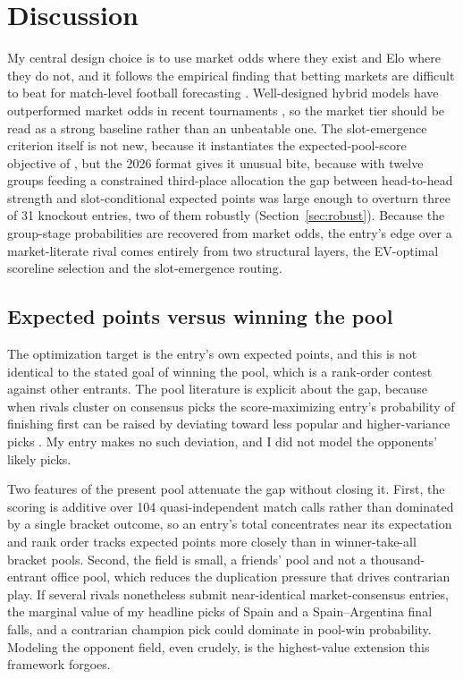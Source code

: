 \documentclass[11pt,letterpaper]{article}
\begin{document}
\section{Discussion}

My central design choice is to use market odds where they exist and Elo where they do not, and it follows the empirical finding that betting markets are difficult to beat for match-level football forecasting \citep{strumbelj2014, leitner2010, hvattum2010}. Well-designed hybrid models have outperformed market odds in recent tournaments \citep{groll2019}, so the market tier should be read as a strong baseline rather than an unbeatable one. The slot-emergence criterion itself is not new, because it instantiates the expected-pool-score objective of \citet{kaplangarstka2001}, but the 2026 format gives it unusual bite, because with twelve groups feeding a constrained third-place allocation the gap between head-to-head strength and slot-conditional expected points was large enough to overturn three of 31 knockout entries, two of them robustly (Section~\ref{sec:robust}). Because the group-stage probabilities are recovered from market odds, the entry's edge over a market-literate rival comes entirely from two structural layers, the EV-optimal scoreline selection and the slot-emergence routing.

\subsection{Expected points versus winning the pool}\label{sec:objective}

The optimization target is the entry's own expected points, and this is not identical to the stated goal of winning the pool, which is a rank-order contest against other entrants. The pool literature is explicit about the gap, because when rivals cluster on consensus picks the score-maximizing entry's probability of finishing first can be raised by deviating toward less popular and higher-variance picks \citep{clairletscher2007, kaplangarstka2001}. My entry makes no such deviation, and I did not model the opponents' likely picks.

Two features of the present pool attenuate the gap without closing it. First, the scoring is additive over 104 quasi-independent match calls rather than dominated by a single bracket outcome, so an entry's total concentrates near its expectation and rank order tracks expected points more closely than in winner-take-all bracket pools. Second, the field is small, a friends' pool and not a thousand-entrant office pool, which reduces the duplication pressure that drives contrarian play. If several rivals nonetheless submit near-identical market-consensus entries, the marginal value of my headline picks of Spain and a Spain--Argentina final falls, and a contrarian champion pick could dominate in pool-win probability. Modeling the opponent field, even crudely, is the highest-value extension this framework forgoes.
\end{document}
